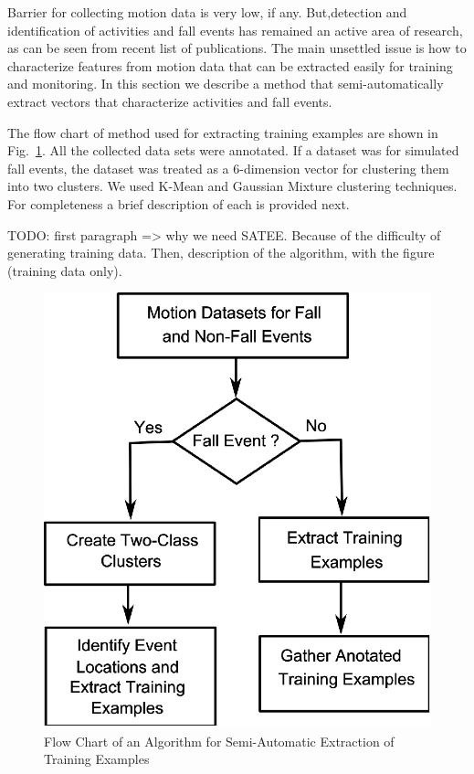 \documentclass{IEEEtran}
\begin{document}
Barrier for collecting motion data is very low, if any. But,detection and identification of activities and fall events has remained an active area of research, as can be seen from recent list of publications. The main unsettled issue is how to characterize features from motion data that can be extracted easily for training and monitoring. In this section we describe a method that semi-automatically extract vectors that characterize activities and fall events.

The flow chart of method used for extracting training examples are shown in Fig.~\ref{fig:FlowChartforAlgorTrainingExamples}. All the collected data sets were annotated. If a dataset was for simulated fall events, the dataset was treated as a 6-dimension vector for clustering them into two clusters. We used K-Mean and Gaussian Mixture clustering techniques. For completeness a brief description of each is provided next.

TODO: first paragraph => why we need SATEE. Because of the difficulty of generating 
training data. Then, description of the algorithm, with the figure (training data only). 
\begin{figure}[htb]
	\centering
		\includegraphics[width = 0.85\columnwidth]{figures/FlowChartAlgoForTrainingExamples.eps}
	\caption{Flow Chart of an Algorithm for Semi-Automatic Extraction of Training Examples}
	\label{fig:FlowChartforAlgorTrainingExamples}
\end{figure}
\end{document}

